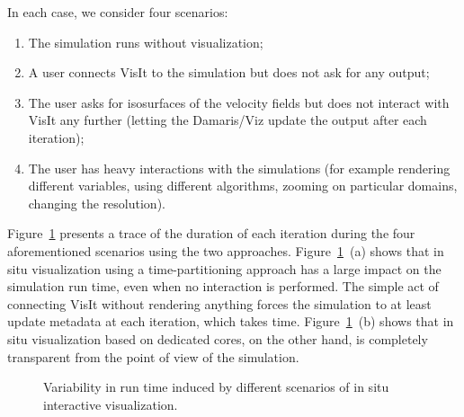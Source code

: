 In each case, we consider four scenarios: 
\begin{enumerate}
	\item The simulation runs without visualization;
	\item A user connects VisIt to the simulation but does not ask for any output;
	\item The user asks for isosurfaces of the velocity fields but does not interact with VisIt any further 
	(letting the Damaris/Viz update the output after each iteration);
	\item The user has heavy interactions with the simulations (for example rendering different variables, 
using different algorithms, zooming on particular domains, changing the 
resolution).
\end{enumerate}

Figure~\ref{fig:nek5variability} presents a trace of the duration of each
iteration during the four aforementioned scenarios using the two approaches.
Figure~\ref{fig:nek5variability}~(a) shows that in situ visualization using 
a time-partitioning approach has a large impact on the 
simulation run time, even when no interaction is performed. The simple act of connecting
VisIt without rendering anything forces the simulation to at least update metadata at each iteration,
which takes time.
Figure~\ref{fig:nek5variability}~(b) shows that in situ visualization based on dedicated cores, 
on the other hand, is completely transparent from the point of view of the simulation.

\begin{figure}[t]
\centering
	\quad
	\caption[Run-time variability in CM1 due to in situ visualization]{Variability 
	in run time induced by different scenarios of in situ 
	interactive visualization.}\label{fig:nek5variability}
\end{figure}

